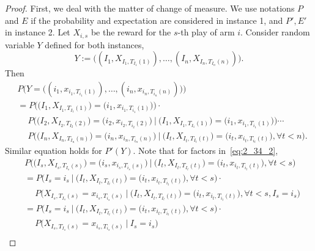 \begin{proof}
    First, we deal with the matter of change of measure.
    We use notations $P$ and $E$ if the probability and expectation are considered
    in instance 1, and $P', E'$ in instance 2.
    Let $X_{i,s}$ be the reward for the $s$-th play of arm $i$.
    Consider random variable $Y$ defined for both instances,
    \begin{equation}
        Y := \big((I_1, X_{I_1, T_{I_1}(1)}),\dots,(I_n, X_{I_n, T_{I_n}(n)})\big).
    \end{equation}
    Then
    \begin{equation}
    \begin{split}
        &P\Big(Y=\big((i_1, x_{i_1, T_{i_1}(1)}),\dots,(i_n, x_{i_n, T_{i_n}(n)})\big)\Big) \\
            &= P\Big(\big(I_1, X_{I_1, T_{I_1}(1)}\big)=\big(i_1, x_{i_1, T_{i_1}(1)}\big)\Big) \cdot \\
            &\quad~  P\Big(\big(I_2, X_{I_2, T_{I_2}(2)}\big)=\big(i_2, x_{i_2, T_{i_2}(2)}\big)~\Big|~
                \big(I_1, X_{I_1, T_{I_1}(1)}\big)=\big(i_1, x_{i_1, T_{i_1}(1)}\big)\Big) \cdots \\
            &\quad~  P\Big(\big(I_n, X_{I_n, T_{I_n}(n)}\big)=\big(i_n, x_{i_n, T_{i_n}(n)}\big)~\Big|~
                \big(I_t, X_{I_t, T_{I_t}(t)}\big)=\big(i_t, x_{i_t, T_{i_t}(t)}\big), \forall t<n\Big). \label{eq:2_34_2}
    \end{split}
    \end{equation}
    Similar equation holds for $P'(Y)$.
    Note that for factors in~\eqref{eq:2_34_2},
    \begin{equation}
        \begin{split}
            &P\Big(\big(I_s, X_{I_s, T_{I_s}(s)}\big)=\big(i_s, x_{i_s, T_{i_s}(s)}\big)~\Big|~
            \big(I_t, X_{I_t, T_{I_t}(t)}\big)=\big(i_t, x_{i_t, T_{i_t}(t)}\big), \forall t<s\Big) \\
            &=P\Big(I_s=i_s~\Big|~
            \big(I_t, X_{I_t, T_{I_t}(t)}\big)=\big(i_t, x_{i_t, T_{i_t}(t)}\big), \forall t<s\Big) \cdot \\
            &\quad~P\Big(X_{I_s, T_{I_s}(s)}=x_{i_s, T_{i_s}(s)}~\Big|~
            \big(I_t, X_{I_t, T_{I_t}(t)}\big)=\big(i_t, x_{i_t, T_{i_t}(t)}\big), \forall t<s, I_s=i_s\Big) \\
            &=P\Big(I_s=i_s~\Big|~
            \big(I_t, X_{I_t, T_{I_t}(t)}\big)=\big(i_t, x_{i_t, T_{i_t}(t)}\big), \forall t<s\Big) \cdot \\
            &\quad~P\Big(X_{I_s, T_{I_s}(s)}=x_{i_s, T_{i_s}(s)}~\Big|~I_s=i_s\Big) \\

\end{split}
\end{equation}
\end{proof}
